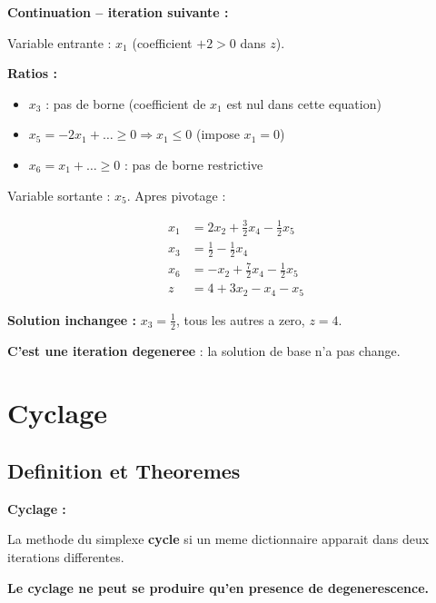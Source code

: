 \documentclass[12pt,a4paper]{article}
\begin{document}
\begin{exemple}
\textbf{Continuation -- iteration suivante :}

Variable entrante : $x_1$ (coefficient $+2 > 0$ dans $z$).

\textbf{Ratios :}
\begin{itemize}
    \item $x_3$ : pas de borne (coefficient de $x_1$ est nul dans cette equation)
    \item $x_5 = -2x_1 + \ldots \geq 0 \Rightarrow x_1 \leq 0$ \quad \textcolor{importantrouge}{(impose $x_1 = 0$)}
    \item $x_6 = x_1 + \ldots \geq 0$ : pas de borne restrictive
\end{itemize}

Variable sortante : $x_5$. Apres pivotage :

\begin{align*}
x_1 &= 2x_2 + \frac{3}{2}x_4 - \frac{1}{2}x_5\\
x_3 &= \frac{1}{2} - \frac{1}{2}x_4\\
x_6 &= -x_2 + \frac{7}{2}x_4 - \frac{1}{2}x_5\\
z &= 4 + 3x_2 - x_4 - x_5
\end{align*}

\textbf{Solution inchangee :} $x_3 = \frac{1}{2}$, tous les autres a zero, $z = 4$.

\textcolor{importantrouge}{\textbf{C'est une iteration degeneree}} : la solution de base n'a pas change.
\end{exemple}

\section{Cyclage}

\subsection{Definition et Theoremes}

\begin{definition}
\textbf{Cyclage :}

La methode du simplexe \textcolor{defvert}{\textbf{cycle}} si un meme dictionnaire apparait dans deux iterations differentes.

\textcolor{importantrouge}{\textbf{Le cyclage ne peut se produire qu'en presence de degenerescence.}}
\end{definition}
\end{document}
